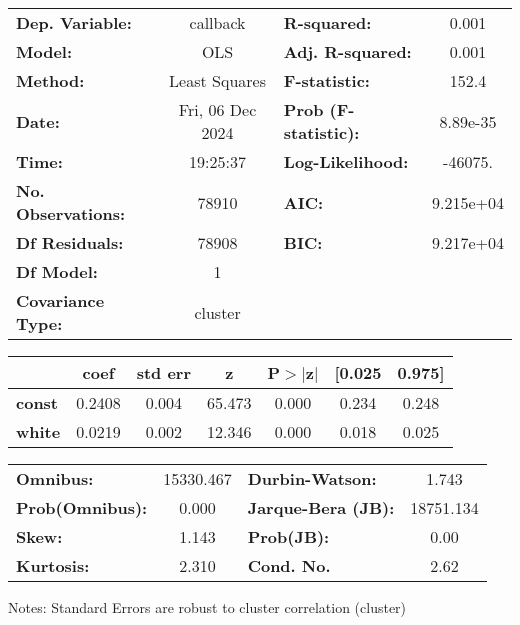 \begin{center}
\begin{tabular}{lclc}
\toprule
\textbf{Dep. Variable:}    &     callback     & \textbf{  R-squared:         } &     0.001   \\
\textbf{Model:}            &       OLS        & \textbf{  Adj. R-squared:    } &     0.001   \\
\textbf{Method:}           &  Least Squares   & \textbf{  F-statistic:       } &     152.4   \\
\textbf{Date:}             & Fri, 06 Dec 2024 & \textbf{  Prob (F-statistic):} &  8.89e-35   \\
\textbf{Time:}             &     19:25:37     & \textbf{  Log-Likelihood:    } &   -46075.   \\
\textbf{No. Observations:} &       78910      & \textbf{  AIC:               } & 9.215e+04   \\
\textbf{Df Residuals:}     &       78908      & \textbf{  BIC:               } & 9.217e+04   \\
\textbf{Df Model:}         &           1      & \textbf{                     } &             \\
\textbf{Covariance Type:}  &     cluster      & \textbf{                     } &             \\
\bottomrule
\end{tabular}
\begin{tabular}{lcccccc}
               & \textbf{coef} & \textbf{std err} & \textbf{z} & \textbf{P$> |$z$|$} & \textbf{[0.025} & \textbf{0.975]}  \\
\midrule
\textbf{const} &       0.2408  &        0.004     &    65.473  &         0.000        &        0.234    &        0.248     \\
\textbf{white} &       0.0219  &        0.002     &    12.346  &         0.000        &        0.018    &        0.025     \\
\bottomrule
\end{tabular}
\begin{tabular}{lclc}
\textbf{Omnibus:}       & 15330.467 & \textbf{  Durbin-Watson:     } &     1.743  \\
\textbf{Prob(Omnibus):} &    0.000  & \textbf{  Jarque-Bera (JB):  } & 18751.134  \\
\textbf{Skew:}          &    1.143  & \textbf{  Prob(JB):          } &      0.00  \\
\textbf{Kurtosis:}      &    2.310  & \textbf{  Cond. No.          } &      2.62  \\
\bottomrule
\end{tabular}
\end{center}

Notes: \newline
 [1] Standard Errors are robust to cluster correlation (cluster)
